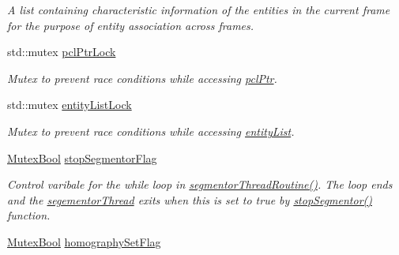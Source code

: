 \begin{DoxyCompactItemize}
\begin{DoxyCompactList}\small\item\em A list containing characteristic information of the entities in the current frame for the purpose of entity association across frames. \end{DoxyCompactList}\item 
\hypertarget{classpersonal_robotics_1_1_object_segmentor_af002f24ebb3f27183bfc0c93aab5cab2}{}std\+::mutex \hyperlink{classpersonal_robotics_1_1_object_segmentor_af002f24ebb3f27183bfc0c93aab5cab2}{pcl\+Ptr\+Lock}\label{classpersonal_robotics_1_1_object_segmentor_af002f24ebb3f27183bfc0c93aab5cab2}

\begin{DoxyCompactList}\small\item\em Mutex to prevent race conditions while accessing \hyperlink{classpersonal_robotics_1_1_object_segmentor_afd8a8a0d82a7116b78142f4ef3fa3c49}{pcl\+Ptr}. \end{DoxyCompactList}\item 
\hypertarget{classpersonal_robotics_1_1_object_segmentor_a05518bed32d4707c6dd608722c1fdd4c}{}std\+::mutex \hyperlink{classpersonal_robotics_1_1_object_segmentor_a05518bed32d4707c6dd608722c1fdd4c}{entity\+List\+Lock}\label{classpersonal_robotics_1_1_object_segmentor_a05518bed32d4707c6dd608722c1fdd4c}

\begin{DoxyCompactList}\small\item\em Mutex to prevent race conditions while accessing \hyperlink{classpersonal_robotics_1_1_object_segmentor_aab2136d73a02806e2b09611ed67e65d9}{entity\+List}. \end{DoxyCompactList}\item 
\hypertarget{classpersonal_robotics_1_1_object_segmentor_a0f9e3d9c51b814f8f6f3f7af9893382e}{}\hyperlink{classpersonal_robotics_1_1_mutex_type}{Mutex\+Bool} \hyperlink{classpersonal_robotics_1_1_object_segmentor_a0f9e3d9c51b814f8f6f3f7af9893382e}{stop\+Segmentor\+Flag}\label{classpersonal_robotics_1_1_object_segmentor_a0f9e3d9c51b814f8f6f3f7af9893382e}

\begin{DoxyCompactList}\small\item\em Control varibale for the while loop in \hyperlink{classpersonal_robotics_1_1_object_segmentor_a54dffdc44e4b61ee329c7524f5c04ed1}{segmentor\+Thread\+Routine()}. The loop ends and the \hyperlink{classpersonal_robotics_1_1_object_segmentor_afa78651f85b2dd6fe132d4c850ab2cef}{segementor\+Thread} exits when this is set to true by \hyperlink{classpersonal_robotics_1_1_object_segmentor_a7704862f53318f456f3efd58d007ea3b}{stop\+Segmentor()} function. \end{DoxyCompactList}\item 
\hypertarget{classpersonal_robotics_1_1_object_segmentor_a9db85709fda1a2926267411e3c9866db}{}\hyperlink{classpersonal_robotics_1_1_mutex_type}{Mutex\+Bool} \hyperlink{classpersonal_robotics_1_1_object_segmentor_a9db85709fda1a2926267411e3c9866db}{homography\+Set\+Flag}\label{classpersonal_robotics_1_1_object_segmentor_a9db85709fda1a2926267411e3c9866db}


\end{DoxyCompactItemize}
